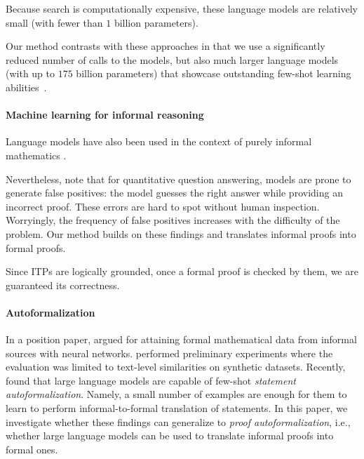 Because search is computationally expensive, these language models are relatively small (with fewer than $1$ billion parameters).

Our method contrasts with these approaches in that we use a significantly reduced number of calls to the models, but also much larger language models (with up to $175$ billion parameters) that showcase outstanding few-shot learning abilities~\citep{gpt3}.

\paragraph{Machine learning for informal reasoning} Language models have also been used in the context of purely informal mathematics \citep{Lample2020Deep, hendrycksmath2021, welleck2021naturalproofs, drori2022neural, welleck2022naturalprover}.

Nevertheless, \citet{lewkowycz2022solving} note that for quantitative question answering, models are prone to generate false positives: the model guesses the right answer while providing an incorrect proof. These errors are hard to spot without human inspection. Worryingly, the frequency of false positives increases with the difficulty of the problem. Our method builds on these findings and translates informal proofs into formal proofs.

Since ITPs are logically grounded, once a formal proof is checked by them, we are guaranteed its correctness.

\paragraph{Autoformalization} 

In a position paper, \citet{szegedy2020promising} argued for attaining formal mathematical data from informal sources with neural networks. \citet{wang2020exploration} performed preliminary experiments where the evaluation was limited to text-level similarities on synthetic datasets. Recently, \citet{wu2022autoformalization} found that large language models \citep{chen2021EvaluatingLL, chowdhery2022palm} are capable of few-shot \textit{statement autoformalization}. Namely, a small number of examples are enough for them to learn to perform informal-to-formal translation of statements. In this paper, we investigate whether these findings can generalize to \textit{proof autoformalization}, i.e., whether large language models can be used to translate informal proofs into formal ones.

